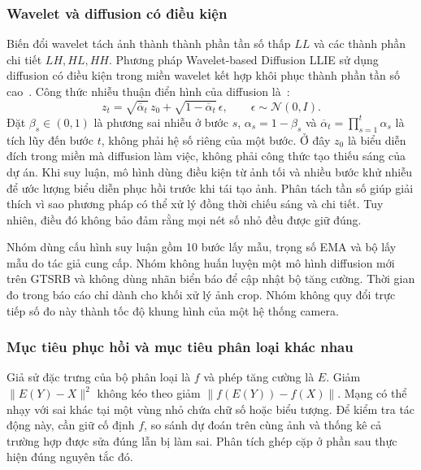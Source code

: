 \subsubsection{Wavelet và diffusion có điều kiện}
Biến đổi wavelet tách ảnh thành thành phần tần số thấp $LL$ và các thành phần chi tiết $LH,HL,HH$. Phương pháp Wavelet-based Diffusion LLIE sử dụng diffusion có điều kiện trong miền wavelet kết hợp khôi phục thành phần tần số cao~\cite{diffusion}. Công thức nhiễu thuận điển hình của diffusion là~\cite{ddpm}:
\begin{equation}
z_t=\sqrt{\overline{\alpha}_t}\,z_0+
\sqrt{1-\overline{\alpha}_t}\,\epsilon,\qquad \epsilon\sim\mathcal{N}(0,I).
\end{equation}
Đặt $\beta_s\in(0,1)$ là phương sai nhiễu ở bước $s$, $\alpha_s=1-\beta_s$ và $\overline{\alpha}_t=\prod_{s=1}^{t}\alpha_s$ là tích lũy đến bước $t$, không phải hệ số riêng của một bước. Ở đây $z_0$ là biểu diễn đích trong miền mà diffusion làm việc, không phải công thức tạo thiếu sáng của dự án. Khi suy luận, mô hình dùng điều kiện từ ảnh tối và nhiều bước khử nhiễu để ước lượng biểu diễn phục hồi trước khi tái tạo ảnh. Phân tách tần số giúp giải thích vì sao phương pháp có thể xử lý đồng thời chiếu sáng và chi tiết. Tuy nhiên, điều đó không bảo đảm rằng mọi nét số nhỏ đều được giữ đúng.

Nhóm dùng cấu hình suy luận gồm 10 bước lấy mẫu, trọng số EMA và bộ lấy mẫu do tác giả cung cấp. Nhóm không huấn luyện một mô hình diffusion mới trên GTSRB và không dùng nhãn biển báo để cập nhật bộ tăng cường. Thời gian đo trong báo cáo chỉ dành cho khối xử lý ảnh crop. Nhóm không quy đổi trực tiếp số đo này thành tốc độ khung hình của một hệ thống camera.

\subsubsection{Mục tiêu phục hồi và mục tiêu phân loại khác nhau}
Giả sử đặc trưng của bộ phân loại là $f$ và phép tăng cường là $E$. Giảm $\|E(Y)-X\|^2$ không kéo theo giảm $\|f(E(Y))-f(X)\|$. Mạng có thể nhạy với sai khác tại một vùng nhỏ chứa chữ số hoặc biểu tượng. Để kiểm tra tác động này, cần giữ cố định $f$, so sánh dự đoán trên cùng ảnh và thống kê cả trường hợp được sửa đúng lẫn bị làm sai. Phân tích ghép cặp ở phần sau thực hiện đúng nguyên tắc đó.
